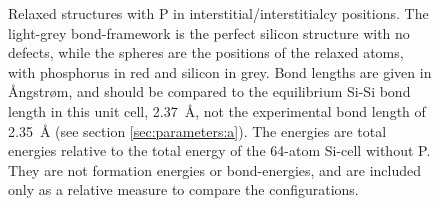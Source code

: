 \documentclass[11pt,bibliography=totoc,index=totoc]{scrbook}   %
\begin{document}
\begin{figure}[htbp]
{    \label{fig:split110}
  }
  \caption{
    Relaxed structures with P in interstitial/interstitialcy positions.
    The light-grey bond-framework is the perfect silicon structure with no defects, 
    while the spheres are the positions of the relaxed atoms, with phosphorus in red
    and silicon in grey.
    Bond lengths are given in Ångstrøm, and should be compared to 
    the equilibrium Si-Si bond length in this unit cell, 2.37~Å, not 
    the experimental bond length of 2.35~Å (see section \ref{sec:parameters:a}).
    The energies are total energies relative to the total energy of the 64-atom Si-cell without P.
    They are not formation energies or bond-energies, and are included only as a relative measure to
    compare the configurations.
  }
  \label{fig:interstitial_positions}
\end{figure}








\end{document}
